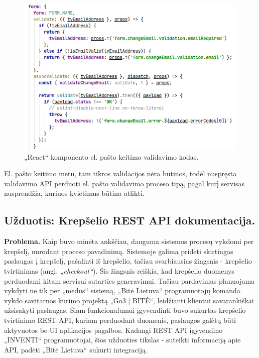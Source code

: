 \begin{figure}[H]
    \centering
    \includegraphics[scale=0.7]{img/email-validate.png}
    \caption{„React“ komponento el. pašto keitimo validavimo kodas.}
    \label{img:email-validate}
\end{figure}

El. pašto keitimo metu, tam tikros validacijos nėra būtinos, todėl nuspręsta validavimo API perduoti el. pašto validavimo proceso tipą, pagal kurį servisas nusprendžia,
kuriuos kvietimus būtina atlikti.


\subsection{Užduotis: Krepšelio REST API dokumentacija.}

\textbf{Problema.}
Kaip buvo minėta ankščiau, dauguma sistemos procesų vykdomi per krepšelį, nurodant proceso pavadinimą. Sistemoje galima pridėti skirtingas paslaugas į krepšelį,
pašalinti iš krepšelio, tačiau svarbiausias žingsnis - krepšelio tvirtinimas (angl. \textit{„checkout“}). Šis žingsnis reiškia, kad krepšelio duomenys perduodami kitam servisui sutarties
generavimui. Tačiau pardavimus planuojama vykdyti ne tik per „medus“ sistemą, „Bitė Lietuva“ programuotojų komanda vykdo savitarnos kūrimo projektą „Go3 | BITĖ“, leidžianti
klientui savarankiškai užsisakyti paslaugas. Šiam funkcionalumui įgyvendinti buvo sukurtas krepšelio tvirtinimo REST API, kuriam perduodant duomenis, paslaugos galėtų būti aktyvuotos
be UI aplikacijos pagalbos. Kadangi REST API įgyvendino „INVENTI“ programuotojai, šios užduoties tikslas - suteikti informaciją apie API, padėti „Bitė Lietuva“ sukurti integraciją.

